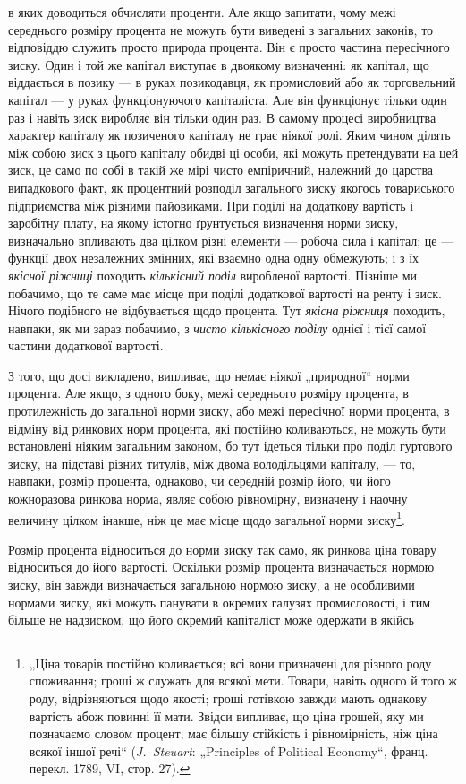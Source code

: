 \parcont{}  %
в яких доводиться обчисляти проценти. Але якщо запитати, чому
межі середнього розміру процента не можуть бути виведені
з загальних законів, то відповіддю служить просто природа процента.
Він є просто частина пересічного зиску. Один і той же
капітал виступає в двоякому визначенні: як капітал, що віддається
в позику — в руках позикодавця, як промисловий або як
торговельний капітал — у руках функціонуючого капіталіста. Але
він функціонує тільки один раз і навіть зиск виробляє він тільки
один раз. В самому процесі виробництва характер капіталу як
позиченого капіталу не грає ніякої ролі. Яким чином ділять
між собою зиск з цього капіталу обидві ці особи, які можуть
претендувати на цей зиск, це само по собі в такій же мірі чисто
емпіричний, належний до царства випадкового факт, як процентний
розподіл загального зиску якогось товариського підприємства
між різними пайовиками. При поділі на додаткову вартість
і заробітну плату, на якому істотно ґрунтується визначення
норми зиску, визначально впливають два цілком різні елементи —
робоча сила і капітал; це — функції двох незалежних змінних, які
взаємно одна одну обмежують; і з їх \emph{якісної ріжниці} походить
\emph{кількісний поділ }виробленої вартості. Пізніше ми побачимо, що
те саме має місце при поділі додаткової вартості на ренту і зиск.
Нічого подібного не відбувається щодо процента. Тут \emph{якісна}
\emph{ріжниця} походить, навпаки, як ми зараз побачимо, з \emph{чисто кількісного
поділу} однієї і тієї самої частини додаткової вартості.

З того, що досі викладено, випливає, що немає ніякої „природної“
норми процента. Але якщо, з одного боку, межі середнього
розміру процента, в протилежність до загальної норми зиску,
або межі пересічної норми процента, в відміну від ринкових
норм процента, які постійно коливаються, не можуть бути встановлені
ніяким загальним законом, бо тут ідеться тільки про
поділ гуртового зиску, на підставі різних титулів, між двома володільцями
капіталу, — то, навпаки, розмір процента, однаково,
чи середній розмір його, чи його кожноразова ринкова норма,
являє собою рівномірну, визначену і наочну величину цілком
інакше, ніж це має місце щодо загальної норми зиску\footnote{
„Ціна товарів постійно коливається; всі вони призначені для різного роду
споживання; гроші ж служать для всякої мети. Товари, навіть одного й того ж
роду, відрізняються щодо якості; гроші готівкою завжди мають однакову вартість
абож повинні її мати. Звідси випливає, що ціна грошей, яку ми позначаємо
словом процент, має більшу стійкість і рівномірність, ніж ціна всякої
іншої речі“ (\emph{J.~Steuart}: „Principles of Political Economy“, франц. перекл. 1789,
VI, стор. 27).
}.

Розмір процента відноситься до норми зиску так само, як ринкова
ціна товару відноситься до його вартості. Оскільки розмір
процента визначається нормою зиску, він завжди визначається
загальною нормою зиску, а не особливими нормами зиску, які
можуть панувати в окремих галузях промисловості, і тим більше
не надзиском, що його окремий капіталіст може одержати в якійсь
\parbreak{}  %

